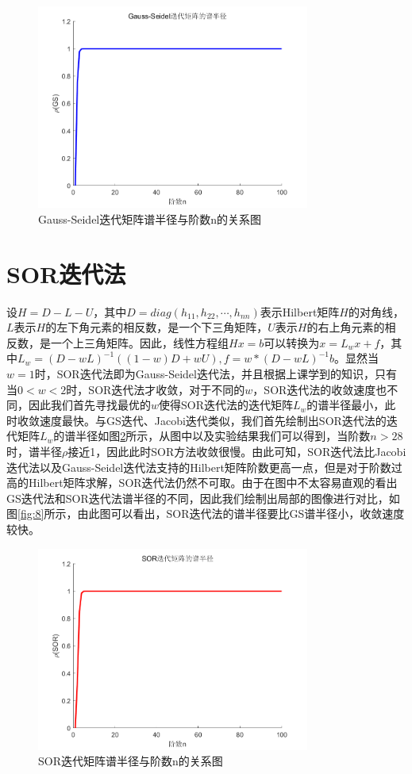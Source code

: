 \documentclass[a4paper]{article}
\begin{document}
\begin{figure}[!h]
	\centering
	\includegraphics[width=0.8\textwidth]{../code/result/gsrho}
	\caption{\label{fig:6}Gauss-Seidel迭代矩阵谱半径与阶数n的关系图}
\end{figure}

\section{SOR迭代法}
设$H=D-L-U$，其中$D=diag(h_{11},h_{22},\cdots,h_{nn})$表示Hilbert矩阵$H$的对角线，$L$表示$H$的左下角元素的相反数，是一个下三角矩阵，$U$表示$H$的右上角元素的相反数，是一个上三角矩阵。因此，线性方程组$Hx=b$可以转换为$x=L_wx+f$，其中$L_w=(D-wL)^{-1}((1-w)D+wU),f=w*(D-wL)^{-1}b$。显然当$w=1$时，SOR迭代法即为Gauss-Seidel迭代法，并且根据上课学到的知识，只有当$0<w<2$时，SOR迭代法才收敛，对于不同的$w$，SOR迭代法的收敛速度也不同，因此我们首先寻找最优的$w$使得SOR迭代法的迭代矩阵$L_w$的谱半径最小，此时收敛速度最快。与GS迭代、Jacobi迭代类似，我们首先绘制出SOR迭代法的迭代矩阵$L_w$的谱半径如图\ref{fig:7}所示，从图中以及实验结果我们可以得到，当阶数$n>28$时，谱半径$\rho$接近1，因此此时SOR方法收敛很慢。由此可知，SOR迭代法比Jacobi迭代法以及Gauss-Seidel迭代法支持的Hilbert矩阵阶数更高一点，但是对于阶数过高的Hilbert矩阵求解，SOR迭代法仍然不可取。由于在图中不太容易直观的看出GS迭代法和SOR迭代法谱半径的不同，因此我们绘制出局部的图像进行对比，如图\ref{fig:8}所示，由此图可以看出，SOR迭代法的谱半径要比GS谱半径小，收敛速度较快。

\begin{figure}[!h]
	\centering
	\includegraphics[width=0.8\textwidth]{../code/result/sorrho}
	\caption{\label{fig:7}SOR迭代矩阵谱半径与阶数n的关系图}
\end{figure}
\end{document}
